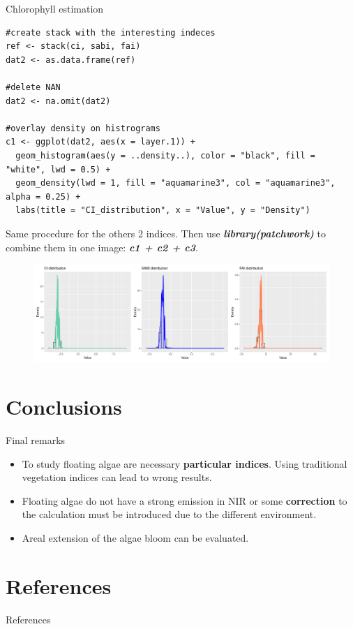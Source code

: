 \documentclass[10pt]{beamer}
\begin{document}
\begin{frame}[fragile]{Chlorophyll estimation}
\begin{lstlisting}[firstnumber = 78]
#create stack with the interesting indeces
ref <- stack(ci, sabi, fai)
dat2 <- as.data.frame(ref)

#delete NAN
dat2 <- na.omit(dat2)

#overlay density on histrograms
c1 <- ggplot(dat2, aes(x = layer.1)) +
  geom_histogram(aes(y = ..density..), color = "black", fill = "white", lwd = 0.5) + 
  geom_density(lwd = 1, fill = "aquamarine3", col = "aquamarine3", alpha = 0.25) +
  labs(title = "CI_distribution", x = "Value", y = "Density")   
\end{lstlisting}   
\end{frame}

\begin{frame}{}
 Same procedure for the others 2 indices. Then use \textit{\textbf{library(patchwork)}} to combine them in one image: \textit{\textbf{c1 + c2 + c3}}.
\begin{figure}
\centering
\includegraphics[width =\textwidth]{images/his_des.pdf}    
\end{figure}
\end{frame}

\section{Conclusions}
\begin{frame}{Final remarks}
\begin{itemize}
    \item To study floating algae are necessary \textbf{particular indices}. Using traditional vegetation indices can lead to wrong results.
    \item Floating algae do not have a strong emission in NIR or some \textbf{correction} to the calculation must be introduced due to the different environment.
    \item Areal extension of the algae bloom can be evaluated.
\end{itemize}
\end{frame}

\section{References}
\begin{frame}[allowframebreaks]{References}


\nocite{nasa}
\nocite{veg_index}
\nocite{article}
\nocite{inproceedings}
\nocite{chlorophyll}
\end{frame}
\end{document}
